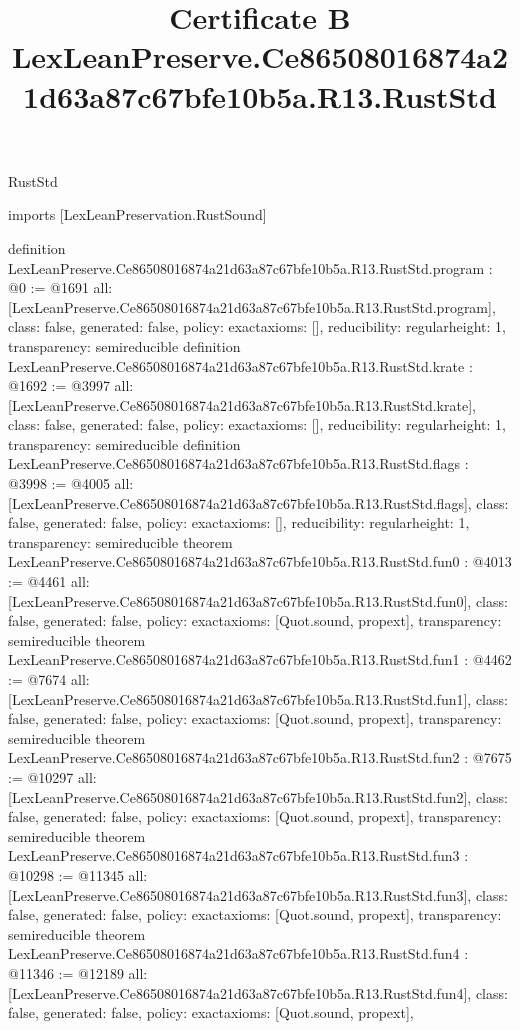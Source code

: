 \begin{lexlean}{RustStd}
\title{Certificate B LexLeanPreserve.Ce86508016874a21d63a87c67bfe10b5a.R13.RustStd}
\begin{coremodule}
imports [LexLeanPreservation.RustSound]

definition LexLeanPreserve.Ce86508016874a21d63a87c67bfe10b5a.R13.RustStd.program : @0 := @1691 {
  all: [LexLeanPreserve.Ce86508016874a21d63a87c67bfe10b5a.R13.RustStd.program],
  class: false,
  generated: false,
  policy: exact{axioms: []},
  reducibility: regular{height: 1},
  transparency: semireducible
}
definition LexLeanPreserve.Ce86508016874a21d63a87c67bfe10b5a.R13.RustStd.krate : @1692 := @3997 {
  all: [LexLeanPreserve.Ce86508016874a21d63a87c67bfe10b5a.R13.RustStd.krate],
  class: false,
  generated: false,
  policy: exact{axioms: []},
  reducibility: regular{height: 1},
  transparency: semireducible
}
definition LexLeanPreserve.Ce86508016874a21d63a87c67bfe10b5a.R13.RustStd.flags : @3998 := @4005 {
  all: [LexLeanPreserve.Ce86508016874a21d63a87c67bfe10b5a.R13.RustStd.flags],
  class: false,
  generated: false,
  policy: exact{axioms: []},
  reducibility: regular{height: 1},
  transparency: semireducible
}
theorem LexLeanPreserve.Ce86508016874a21d63a87c67bfe10b5a.R13.RustStd.fun0 : @4013 := @4461 {
  all: [LexLeanPreserve.Ce86508016874a21d63a87c67bfe10b5a.R13.RustStd.fun0],
  class: false,
  generated: false,
  policy: exact{axioms: [Quot.sound, propext]},
  transparency: semireducible
}
theorem LexLeanPreserve.Ce86508016874a21d63a87c67bfe10b5a.R13.RustStd.fun1 : @4462 := @7674 {
  all: [LexLeanPreserve.Ce86508016874a21d63a87c67bfe10b5a.R13.RustStd.fun1],
  class: false,
  generated: false,
  policy: exact{axioms: [Quot.sound, propext]},
  transparency: semireducible
}
theorem LexLeanPreserve.Ce86508016874a21d63a87c67bfe10b5a.R13.RustStd.fun2 : @7675 := @10297 {
  all: [LexLeanPreserve.Ce86508016874a21d63a87c67bfe10b5a.R13.RustStd.fun2],
  class: false,
  generated: false,
  policy: exact{axioms: [Quot.sound, propext]},
  transparency: semireducible
}
theorem LexLeanPreserve.Ce86508016874a21d63a87c67bfe10b5a.R13.RustStd.fun3 : @10298 := @11345 {
  all: [LexLeanPreserve.Ce86508016874a21d63a87c67bfe10b5a.R13.RustStd.fun3],
  class: false,
  generated: false,
  policy: exact{axioms: [Quot.sound, propext]},
  transparency: semireducible
}
theorem LexLeanPreserve.Ce86508016874a21d63a87c67bfe10b5a.R13.RustStd.fun4 : @11346 := @12189 {
  all: [LexLeanPreserve.Ce86508016874a21d63a87c67bfe10b5a.R13.RustStd.fun4],
  class: false,
  generated: false,
  policy: exact{axioms: [Quot.sound, propext]},
}
\end{coremodule}
\end{lexlean}
